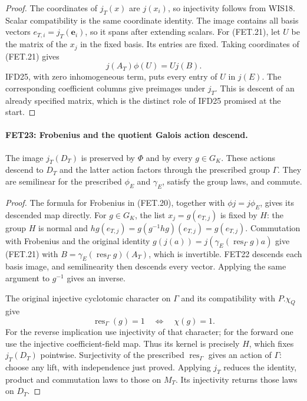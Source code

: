 \documentclass[11pt,a4paper]{article}
\numberwithin{equation}{section}
\theoremstyle{remark}\newtheorem{remark}[theorem]{Remark}
\begin{document}
\begin{proof}
The coordinates of $j_T(x)$ are $j(x_i)$, so injectivity follows
from WIS18. Scalar compatibility is the same coordinate identity.
The image contains all basis vectors $e_{T,i}=j_T(\mathbf e_i)$,
so it spans after extending scalars.
For (FET.21), let $U$ be the matrix of the $x_j$ in the fixed
basis. Its entries are fixed. Taking coordinates of (FET.21)
gives
\[
                       j(A_T)\phi(U)=Uj(B).
\]
IFD25, with zero inhomogeneous term, puts every entry of $U$
in $j(E)$. The corresponding coefficient columns give preimages
under $j_T$. This is descent of an already specified matrix,
which is the distinct role of IFD25 promised at the start.
\end{proof}

\paragraph{FET23: Frobenius and the quotient Galois action descend.}
\label{claim:FET23}
The image $j_T(D_T)$ is preserved by $\Phi$ and by every
$g\in G_K$. These actions descend to $D_T$ and the latter
action factors through the prescribed group $\Gamma$.
They are semilinear for the prescribed $\phi_E$ and
$\gamma_E$, satisfy the group laws, and commute.

\begin{proof}
The formula for Frobenius in (FET.20), together with
$\phi j=j\phi_E$, gives its descended map directly.
For $g\in G_K$, the list $x_j=g(e_{T,j})$ is fixed by $H$:
the group $H$ is normal and
$h g(e_{T,j})=g(g^{-1}hg)(e_{T,j})=g(e_{T,j})$.
Commutation with Frobenius and the original identity
$g(j(a))=j(\gamma_E(\operatorname{res}_\Gamma g)a)$ give
(FET.21) with
$B=\gamma_E(\operatorname{res}_\Gamma g)(A_T)$, which is
invertible. FET22 descends each basis image, and semilinearity
then descends every vector. Applying the same argument to
$g^{-1}$ gives an inverse.

The original injective cyclotomic character on $\Gamma$ and
its compatibility with $P.\chi_Q$ give
\[
             \operatorname{res}_\Gamma(g)=1
                        \quad\Longleftrightarrow\quad\chi(g)=1.
\]
For the reverse implication use injectivity of that character;
for the forward one use the injective coefficient-field map.
Thus its kernel is precisely $H$, which fixes $j_T(D_T)$
pointwise. Surjectivity of the prescribed
$\operatorname{res}_\Gamma$ gives an action of $\Gamma$:
choose any lift, with independence just proved. Applying $j_T$
reduces the identity, product and commutation laws to those on
$M_T$. Its injectivity returns those laws on $D_T$.
\end{proof}
\end{document}
